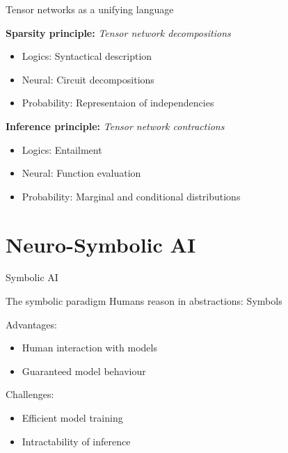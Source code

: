 \documentclass{beamer}
\begin{document}
    \begin{frame}{Tensor networks as a unifying language}

        {\bf Sparsity principle:} \emph{Tensor network decompositions}
        \begin{itemize}
            \item Logics: Syntactical description
            \item Neural: Circuit decompositions
            \item Probability: Representaion of independencies
        \end{itemize}

            {\bf Inference principle:} \emph{Tensor network contractions}
        \begin{itemize}
            \item Logics: Entailment
            \item Neural: Function evaluation
            \item Probability: Marginal and conditional distributions
        \end{itemize}

    \end{frame}


    \section{Neuro-Symbolic AI}

    \begin{frame}{Symbolic AI}

        \begin{block}{The symbolic paradigm}
            Humans reason in abstractions: Symbols
        \end{block}

        Advantages:
        \begin{itemize}
            \item Human interaction with models
            \item Guaranteed model behaviour
        \end{itemize}

        Challenges:
        \begin{itemize}
            \item Efficient model training
            \item Intractability of inference
        \end{itemize}

    \end{frame}
\end{document}
